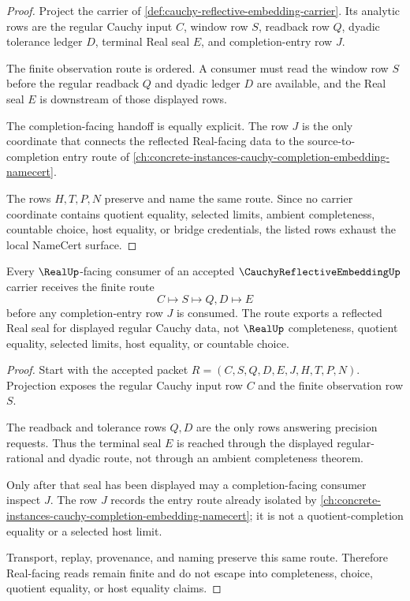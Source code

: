 \begin{proof}
Project the carrier of \autoref{def:cauchy-reflective-embedding-carrier}. Its analytic rows are the regular Cauchy input $C$, window row $S$, readback row $Q$, dyadic tolerance ledger $D$, terminal Real seal $E$, and completion-entry row $J$.

The finite observation route is ordered. A consumer must read the window row $S$ before the regular readback $Q$ and dyadic ledger $D$ are available, and the Real seal $E$ is downstream of those displayed rows.

The completion-facing handoff is equally explicit. The row $J$ is the only coordinate that connects the reflected Real-facing data to the source-to-completion entry route of \autoref{ch:concrete-instances-cauchy-completion-embedding-namecert}.

The rows $H,T,P,N$ preserve and name the same route. Since no carrier coordinate contains quotient equality, selected limits, ambient completeness, countable choice, host equality, or bridge credentials, the listed rows exhaust the local NameCert surface.
\end{proof}

\begin{theorem}
\label{thm:cauchy-reflective-embedding-real-handoff}
Every $\RealUp$-facing consumer of an accepted $\CauchyReflectiveEmbeddingUp$ carrier receives the finite route
$$
C\longmapsto S\longmapsto Q,D\longmapsto E
$$
before any completion-entry row $J$ is consumed. The route exports a reflected Real seal for displayed regular Cauchy data, not $\RealUp$ completeness, quotient equality, selected limits, host equality, or countable choice.
\end{theorem}
\begin{proof}
Start with the accepted packet $R=(C,S,Q,D,E,J,H,T,P,N)$. Projection exposes the regular Cauchy input row $C$ and the finite observation row $S$.

The readback and tolerance rows $Q,D$ are the only rows answering precision requests. Thus the terminal seal $E$ is reached through the displayed regular-rational and dyadic route, not through an ambient completeness theorem.

Only after that seal has been displayed may a completion-facing consumer inspect $J$. The row $J$ records the entry route already isolated by \autoref{ch:concrete-instances-cauchy-completion-embedding-namecert}; it is not a quotient-completion equality or a selected host limit.

Transport, replay, provenance, and naming preserve this same route. Therefore Real-facing reads remain finite and do not escape into completeness, choice, quotient equality, or host equality claims.
\end{proof}

